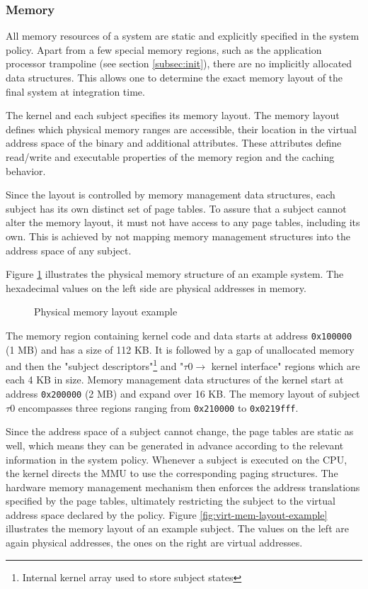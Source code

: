 \subsubsection{Memory}
All memory resources of a system are static and explicitly specified in the
system policy. Apart from a few special memory regions, such as the application
processor trampoline (see section \ref{subsec:init}), there
are no implicitly allocated data structures. This allows one to determine the
exact memory layout of the final system at integration time.

The kernel and each subject specifies its memory layout. The memory layout
defines which physical memory ranges are accessible, their location in the
virtual address space of the binary and additional attributes. These attributes
define read/write and executable properties of the memory region and the caching
behavior.

Since the layout is controlled by memory management data structures,
each subject has its own distinct set of page tables. To assure that a subject
cannot alter the memory layout, it must not have access to any page tables,
including its own. This is achieved by not mapping memory management structures
into the address space of any subject.

Figure \ref{fig:phys-mem-layout-example} illustrates the physical memory
structure of an example system. The hexadecimal values on the left side are
physical addresses in memory.

\begin{figure}[h]
	\centering
	
	\caption{Physical memory layout example}
	\label{fig:phys-mem-layout-example}
\end{figure}

The memory region containing kernel code and data starts at address
\texttt{0x100000} (1 MB) and has a size of 112 KB. It is followed by a gap of
unallocated memory and then the "subject descriptors"\footnote{Internal kernel
array used to store subject states} and "$\tau0\rightarrow$ kernel interface"
regions which are each 4 KB in size.  Memory management data structures of the
kernel start at address \texttt{0x200000} (2 MB) and expand over 16 KB. The
memory layout of subject $\tau0$ encompasses three regions ranging from
\texttt{0x210000} to \texttt{0x0219fff}.

Since the address space of a subject cannot change, the page tables are static
as well, which means they can be generated in advance according to the relevant
information in the system policy. Whenever a subject is executed on the CPU, the
kernel directs the MMU to use the corresponding paging structures. The hardware
memory management mechanism then enforces the address translations specified by
the page tables, ultimately restricting the subject to the virtual address space
declared by the policy. Figure \ref{fig:virt-mem-layout-example} illustrates the
memory layout of an example subject. The values on the left are again physical
addresses, the ones on the right are virtual addresses.

